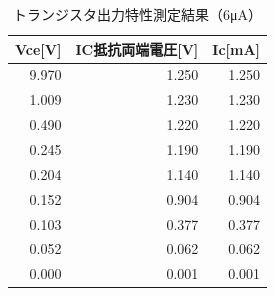 \documentclass[titlepage]{jarticle}
\begin{document}
\begin{table}[htbp]
    \caption{トランジスタ出力特性測定結果（6μA）}
    \begin{center}
        \begin{tabular}{r|r|r}
            \hline\hline
            \multicolumn{1}{l|}{Vce[V]} & \multicolumn{1}{l|}{IC抵抗両端電圧[V]} & \multicolumn{1}{l}{Ic[mA]} \\ \hline
            9.970                       & 1.250                                  & 1.250                      \\ \hline
            1.009                       & 1.230                                  & 1.230                      \\ \hline
            0.490                       & 1.220                                  & 1.220                      \\ \hline
            0.245                       & 1.190                                  & 1.190                      \\ \hline
            0.204                       & 1.140                                  & 1.140                      \\ \hline
            0.152                       & 0.904                                  & 0.904                      \\ \hline
            0.103                       & 0.377                                  & 0.377                      \\ \hline
            0.052                       & 0.062                                  & 0.062                      \\ \hline
            0.000                       & 0.001                                  & 0.001                      \\ \hline
        \end{tabular}
    \end{center}
    \label{トランジスタ出力特性測定結果（6μA）}
\end{table}
\end{document}
